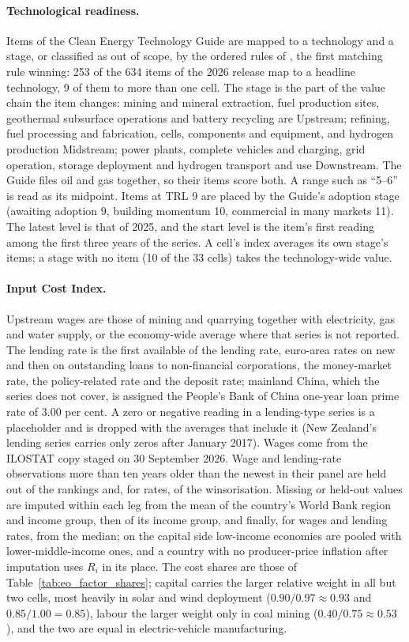 \paragraph{Technological readiness.} Items of the Clean Energy Technology Guide are mapped to a
technology and a stage, or classified as out of scope, by the ordered rules of
, the first matching rule winning: 253 of the
634 items of the 2026 release map to a headline technology, 9 of them to more than one cell. The
stage is the part of the value chain the item changes: mining and mineral extraction, fuel
production sites, geothermal subsurface operations and battery recycling are Upstream; refining,
fuel processing and fabrication, cells, components and equipment, and hydrogen production
Midstream; power plants, complete vehicles and charging, grid operation, storage deployment and
hydrogen transport and use Downstream. The Guide files oil and gas together, so their items score
both. A range such as ``5--6'' is read as its midpoint. Items at TRL 9 are placed by
the Guide's adoption stage (awaiting adoption 9, building momentum 10, commercial in many markets
11). The latest level is that of 2025, and the start level is the item's first reading among the
first three years of the series. A cell's index averages its own stage's items; a stage with no
item (10 of the 33 cells) takes the technology-wide value.

\paragraph{Input Cost Index.} Upstream wages are those of mining and quarrying together with
electricity, gas and water supply, or the economy-wide average where that series is not reported.
The lending rate is the first available of the lending rate, euro-area rates on new and then on
outstanding loans to non-financial corporations, the money-market rate, the policy-related rate
and the deposit rate; mainland China, which the series does not cover, is assigned the People's
Bank of China one-year loan prime rate of 3.00 per cent. A zero or negative reading in a
lending-type series is a placeholder and is dropped with the averages that include it (New
Zealand's lending series carries only zeros after January 2017). Wages come from the ILOSTAT
copy staged on 30 September 2026. Wage and lending-rate observations more
than ten years older than the newest in their panel are held out of the rankings and, for rates,
of the winsorisation. Missing or held-out values are imputed within each leg from the mean of the
country's World Bank region and income group, then of its income group, and finally, for wages
and lending rates, from the median; on the capital side low-income economies are pooled with
lower-middle-income ones, and a country with no producer-price inflation after imputation uses
$R_i$ in its place. The cost shares are those of Table~\ref{tab:eo_factor_shares}; capital carries
the larger relative weight in all but two cells, most heavily in solar and wind deployment
($0.90/0.97\approx0.93$ and $0.85/1.00=0.85$), labour the larger weight only in coal mining
($0.40/0.75\approx0.53$), and the two are equal in electric-vehicle manufacturing.

